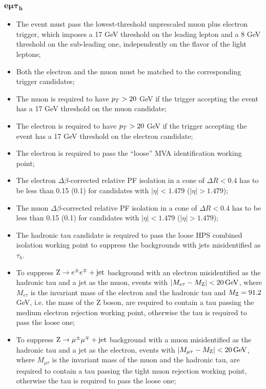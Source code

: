 \subsubsection{$\boldsymbol{e\mu\tau_h}$}
\begin{itemize}
\item The event must pass the lowest-threshold unprescaled muon plus electron trigger, which imposes a 17 GeV threshold on the leading lepton \pT and a 8 GeV threshold on the sub-leading one, independently on the flavor of the light leptons;
\item Both the electron and the muon must be matched to the corresponding trigger candidates;
\item The muon is required to have $p_{T} > 20$ GeV if the trigger accepting the event has a 17 GeV threshold on the muon candidate;
\item The electron is required to have $p_{T} > 20$ GeV if the trigger accepting the event has a 17 GeV threshold on the electron candidate;
\item The electron is required to pass the ``loose'' MVA identification working point;
\item The electron $\Delta \beta$-corrected relative PF isolation in a cone of $\Delta R < 0.4$ has to be less than 0.15 (0.1) for candidates with $|\eta| < 1.479$ ($|\eta| > 1.479$);
\item The muon $\Delta \beta$-corrected relative PF isolation in a cone of $\Delta R < 0.4$ has to be less than 0.15 (0.1) for candidates with $|\eta| < 1.479$ ($|\eta| > 1.479$);
\item The hadronic tau candidate is required to pass the loose HPS combined isolation working point to suppress the backgrounds with jets misidentified as $\tau_h$.
\item To suppress $\mathrm{Z}\rightarrow e^\pm e^\mp+\mathrm{jet}$ background with an electron misidentified as the hadronic tau and a jet as the muon, events with $|M_{e\tau} - M_{\mathrm{Z}}| < 20\, \mathrm{GeV}$, where $M_{e\tau}$ is the invariant mass of the electron and the hadronic tau and $M_{\mathrm{Z}} = 91.2$ GeV, i.e. the mass of the Z boson, are required to contain a tau passing the medium electron rejection working point, otherwise the tau is required to pass the loose one;
\item To suppress $\mathrm{Z}\rightarrow\mu^\pm \mu^\mp+\mathrm{jet}$ background with a muon misidentified as the hadronic tau and a jet as the electron, events with $|M_{\mu\tau} - M_{\mathrm{Z}}| < 20\, \mathrm{GeV}$, where $M_{\mu\tau}$ is the invariant mass of the muon and the hadronic tau, are required to contain a tau passing the tight muon rejection working point, otherwise the tau is required to pass the loose one;
\end{itemize}

